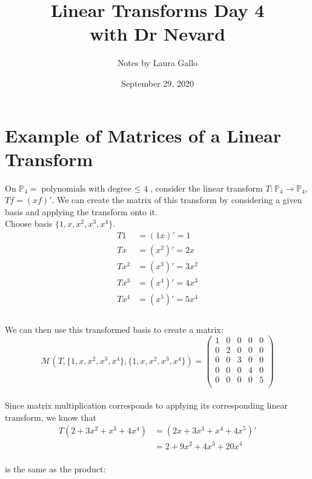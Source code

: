 \documentclass{article}
\title{Linear Transforms Day 4 \\ with Dr Nevard}
\author{Notes by Laura Gallo}
\date{September 29, 2020}
\begin{document}
\maketitle

\section{Example of Matrices of a Linear Transform}
On $\mathbb{P}_4=\text{polynomials with degree $\leq$ 4}$, consider the linear transform $T: \mathbb{P}_4\rightarrow \mathbb{P}_4$, $Tf=(xf)'$. We can create the matrix of this transform by considering a given basis and applying the transform onto it. \\
Choose basis $\{1, x, x^2, x^3, x^4\}$. \\
\begin{equation*}
\begin{split}
	T1 & =(1x)' =1 \\
	Tx & =(x^2)' =2x \\
	Tx^2 & =(x^3)' =3x^2 \\
	Tx^3 & =(x^4)' =4x^3 \\
	Tx^4 & =(x^5)' =5x^4 \\
\end{split}
\end{equation*}
\\
We can then use this transformed basis to create a matrix:
\begin{equation*}
	\mathcal{M}(T, \{1, x, x^2, x^3, x^4\}, \{1, x, x^2, x^3, x^4\}) = \left(
	\begin{matrix}
		1 & 0 & 0 & 0 & 0 \\
		0 & 2 & 0 & 0 & 0 \\
		0 & 0 & 3 & 0 & 0 \\
		0 & 0 & 0 & 4 & 0 \\
		0 & 0 & 0 & 0 & 5 \\
	\end{matrix}
	\right)
\end{equation*}
\\
Since matrix multiplication corresponds to applying its corresponding linear transform, we know that
\begin{equation*}
\begin{split}
	T(2+3x^2+x^3+4x^4) &= (2x+3x^3+x^4+4x^5)' \\
	&=2+9x^2+4x^3+20x^4
\end{split}
\end{equation*}
\\
is the same as the product:
\end{document}
